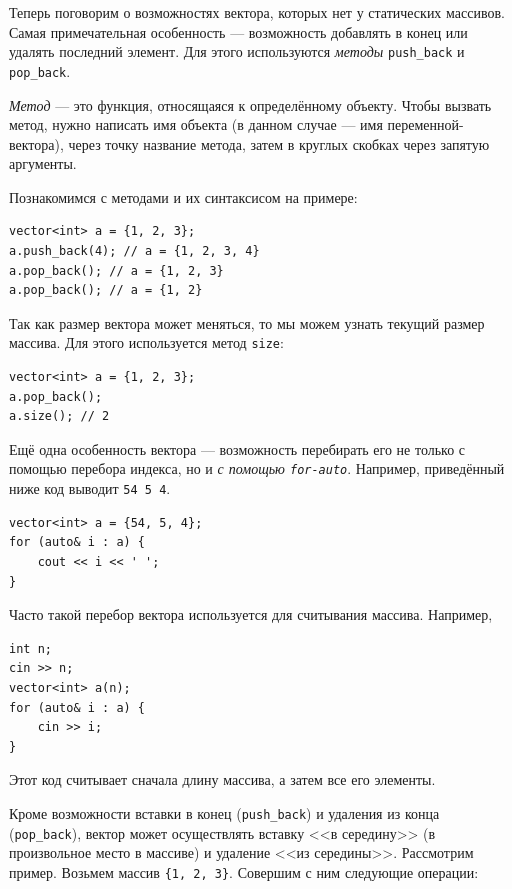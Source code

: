 \documentclass{article}
\begin{document}
	Теперь поговорим о возможностях вектора, которых нет у статических массивов. Самая примечательная особенность --- возможность добавлять в конец или удалять последний элемент. Для этого используются \textit{методы} \texttt{push\_back} и \texttt{pop\_back}.
	
	\textit{Метод} --- это функция, относящаяся к определённому объекту. Чтобы вызвать метод, нужно написать имя объекта (в данном случае --- имя переменной-вектора), через точку название метода, затем в круглых скобках через запятую аргументы.
	
	Познакомимся с методами и их синтаксисом на примере:
	
	\begin{lstlisting}
vector<int> a = {1, 2, 3};
a.push_back(4); // a = {1, 2, 3, 4}
a.pop_back(); // a = {1, 2, 3}
a.pop_back(); // a = {1, 2}
	\end{lstlisting}
	
	Так как размер вектора может меняться, то мы можем узнать текущий размер массива. Для этого используется метод \texttt{size}:
	
	\begin{lstlisting}
vector<int> a = {1, 2, 3};
a.pop_back();
a.size(); // 2
	\end{lstlisting}
	
	Ещё одна особенность вектора --- возможность перебирать его не только с помощью перебора индекса, но и \textit{с помощью \texttt{for-auto}}. Например, приведённый ниже код выводит \texttt{54 5 4}.
	
	\begin{lstlisting}
vector<int> a = {54, 5, 4};
for (auto& i : a) {
	cout << i << ' ';
}
	\end{lstlisting}
	
	Часто такой перебор вектора используется для считывания массива. Например,
	
	\begin{lstlisting}
int n;
cin >> n;
vector<int> a(n);
for (auto& i : a) {
	cin >> i;
}
	\end{lstlisting}
	
	Этот код считывает сначала длину массива, а затем все его элементы.
	
	Кроме возможности вставки в конец (\texttt{push\_back}) и удаления из конца (\texttt{pop\_back}), вектор может осуществлять вставку <<в середину>> (в произвольное место в массиве) и удаление <<из середины>>. Рассмотрим пример. Возьмем массив \texttt{\{1, 2, 3\}}. Совершим с ним следующие операции:
	
\end{document}
